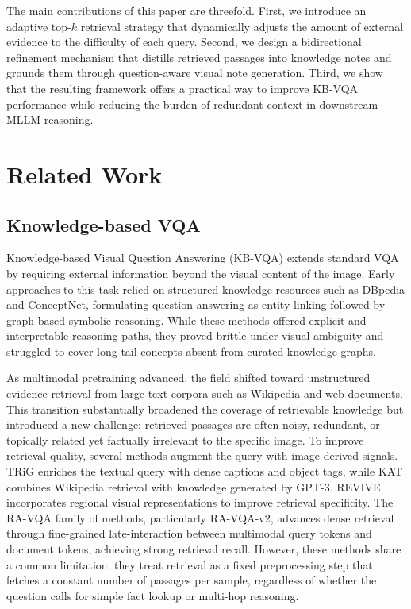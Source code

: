 \documentclass[manuscript,screen,review]{acmart}
\begin{document}
The main contributions of this paper are threefold. First, we introduce an adaptive top-$k$ retrieval strategy that dynamically adjusts the amount of external evidence to the difficulty of each query. Second, we design a bidirectional refinement mechanism that distills retrieved passages into knowledge notes and grounds them through question-aware visual note generation. Third, we show that the resulting framework offers a practical way to improve KB-VQA performance while reducing the burden of redundant context in downstream MLLM reasoning.

\section{Related Work}

\subsection{Knowledge-based VQA}

Knowledge-based Visual Question Answering (KB-VQA) extends standard VQA by requiring external information beyond the visual content of the image. Early approaches to this task relied on structured knowledge resources such as DBpedia and ConceptNet, formulating question answering as entity linking followed by graph-based symbolic reasoning. While these methods offered explicit and interpretable reasoning paths, they proved brittle under visual ambiguity and struggled to cover long-tail concepts absent from curated knowledge graphs.

As multimodal pretraining advanced, the field shifted toward unstructured evidence retrieval from large text corpora such as Wikipedia and web documents. This transition substantially broadened the coverage of retrievable knowledge but introduced a new challenge: retrieved passages are often noisy, redundant, or topically related yet factually irrelevant to the specific image. To improve retrieval quality, several methods augment the query with image-derived signals. TRiG enriches the textual query with dense captions and object tags, while KAT combines Wikipedia retrieval with knowledge generated by GPT-3. REVIVE incorporates regional visual representations to improve retrieval specificity. The RA-VQA family of methods, particularly RA-VQA-v2, advances dense retrieval through fine-grained late-interaction between multimodal query tokens and document tokens, achieving strong retrieval recall. However, these methods share a common limitation: they treat retrieval as a fixed preprocessing step that fetches a constant number of passages per sample, regardless of whether the question calls for simple fact lookup or multi-hop reasoning.
\end{document}
